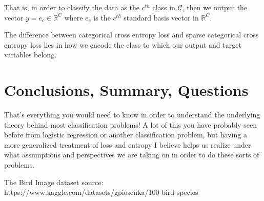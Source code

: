 \documentclass[12pt]{article}
\theoremstyle{definition}
\numberwithin{equation}{section}
\newcommand{\R}{\ensuremath{\mathbb{R}}}
\begin{document}
That is, in order to classify the data as the $c^{th}$ class in $\mathcal{C}$, then we output the vector $y = e_c\in \R^C$ where $e_c$ is the $c^{th}$ standard basis vector in $\R^C$.\smallskip


The difference between categorical cross entropy loss and sparse categorical cross entropy loss lies in how we encode the class to which our output and target variables belong.

\section{Conclusions, Summary, Questions}

That's everything you would need to know in order to understand the underlying theory behind most classification problems! A lot of this you have probably seen before from logistic regression or another classification problem, but having a more generalized treatment of loss and entropy I believe helps us realize under what assumptions and perspectives we are taking on in order to do these sorts of problems.

\newpage



The Bird Image dataset source: https://www.kaggle.com/datasets/gpiosenka/100-bird-species 


\end{document}
